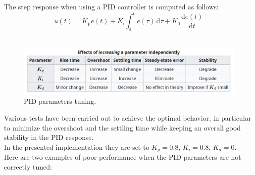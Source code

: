 \documentclass[11pt,a4paper]{article}
\begin{document}
The step response when using a PID controller is computed as follows:
$$
u(t)=K_{\text{p}}e(t)+K_{\text{i}}\int _{0}^{t}e(\tau )\,\mathrm {d} \tau +K_{\text{d}}{\frac {\mathrm {d} e(t)}{\mathrm {d} t}}
$$\\

\begin{figure}[H]
    \centering
    \includegraphics[scale=0.4]{other/PID_parameters_description.png}
    \caption{PID parameters tuning.}
\end{figure}

Various tests have been carried out to achieve the optimal behavior, in particular to minimize
the overshoot and the settling time while keeping an overall good stability in the PID response.\\

In the presented implementation they are set to $K_p = 0.8$, $K_i = 0.8$, $K_d = 0$.\\

Here are two examples of poor performance when the PID parameters are not correctly tuned:
\end{document}
